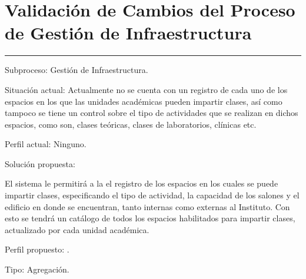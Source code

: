 \section{Validación de Cambios del Proceso de Gestión de Infraestructura}
\label{section:PF-GINF:validacion} 

\hrule
\vspace{0.2cm}
\begin{Cdescription}
	\item[Subproceso:] Gestión de Infraestructura.
	\item[Situación actual:] Actualmente no se cuenta con un registro de cada uno de los espacios en los que las unidades académicas pueden impartir clases, así como tampoco se tiene un control sobre el tipo de actividades que se realizan en dichos espacios, como son, clases teóricas, clases de laboratorios, clínicas etc. 
	\item[Perfil actual:] Ninguno.
	\item[Solución propuesta:] 
	
	El sistema le permitirá a la  el registro de los espacios en los cuales se puede impartir clases, especificando el tipo de actividad, la capacidad de los salones y el edificio en donde se encuentran, tanto internas como externas al Instituto. Con esto se tendrá un catálogo de todos los espacios habilitados para impartir clases, actualizado por cada unidad académica.
	
	\item[Perfil propuesto:] .
	\item[Tipo:] Agregación.\\
	
\end{Cdescription}



